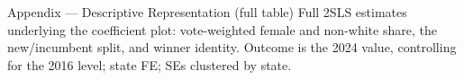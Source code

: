 
\begin{frame}{Appendix --- Descriptive Representation (full table)}
\hypertarget{app:representation}{}
\small
Full 2SLS estimates underlying the coefficient plot: vote-weighted female and non-white share, the new/incumbent split, and winner identity. Outcome is the 2024 value, controlling for the 2016 level; state FE; SEs clustered by state.
\smallskip
\begin{center}
\scriptsize
\resizebox{\linewidth}{!}{}
\end{center}
\smallskip
\footnotesize \hfill\hyperlink{src:representation}{}
\end{frame}
